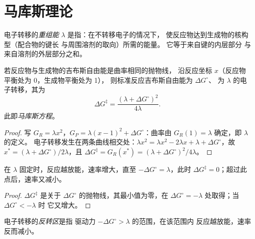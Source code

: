 \section{马库斯理论}

\begin{definition}[重组能]\label{def:b3:complex-mechanisms:reorganisation}
电子转移的\emph{重组能} $\lambda$ 是指：在不转移电子的情况下，
使反应物达到生成物的核构型（配合物的键长
与周围溶剂的取向）所需的能量。
它等于来自键的内层部分
与来自溶剂的外层部分之和。
\end{definition}

\begin{theorem}[马库斯方程]\label{thm:b3:complex-mechanisms:marcus}
若反应物与生成物的吉布斯自由能是曲率相同的抛物线，
沿反应坐标 $x$（反应物平衡处为 0，生成物平衡处为 1），
则标准反应吉布斯自由能为 $\Delta G^\circ$、
为 $\lambda$ 的电子转移，其为
\[
  \Delta G^{\ddagger} = \frac{(\lambda + \Delta G^\circ)^2}{4\lambda} .
\]
此即\emph{马库斯方程}。
\end{theorem}

\begin{proof}
写 $G_R = \lambda x^2$，$G_P = \lambda(x - 1)^2 + \Delta G^\circ$：曲率由 $G_R(1) = \lambda$ 确定，即 $\lambda$ 的定义。
电子转移发生在两条曲线相交处：$\lambda x^2 = \lambda x^2 - 2\lambda x + \lambda +
\Delta G^\circ$，故 $x^\ast = (\lambda + \Delta G^\circ)/2\lambda$，且 $\Delta G^{\ddagger} = G_R(x^\ast) = (\lambda + \Delta G^\circ)^2/4\lambda$。
\end{proof}

\begin{corollary}[反转区]\label{cor:b3:complex-mechanisms:inverted}
在 $\lambda$ 固定时，反应越放能，速率增大，直至
$-\Delta G^\circ = \lambda$，此时 $\Delta G^{\ddagger} = 0$；超过此点后，速率又减小。
\end{corollary}

\begin{proof}
$\Delta G^{\ddagger}$ 是关于 $\Delta G^\circ$ 的抛物线，其最小值为零，在 $\Delta G^\circ = -\lambda$ 处取得；当 $\Delta G^\circ < -\lambda$ 时
它又增大。
\end{proof}

\begin{definition}[反转区]\label{def:b3:complex-mechanisms:inverted}
电子转移的\emph{反转区}是指
驱动力 $-\Delta G^\circ > \lambda$ 的范围，在该范围内
反应越放能，速率反而减小。
\end{definition}

